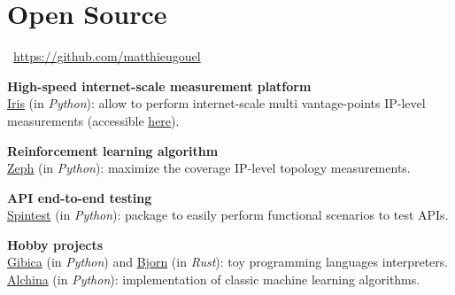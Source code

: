 \documentclass[11pt,a4paper,sans]{moderncv} %
\begin{document}

\section{Open Source}

\faGithub~\href{https://github.com/matthieugouel}{https://github.com/matthieugouel}

\vspace{+0.25cm}
\textbf{High-speed internet-scale measurement platform}\\
\href{https://github.com/dioptra-io/iris}{Iris} (in \emph{Python}): allow to perform internet-scale multi vantage-points IP-level measurements (accessible \href{https://iris.dioptra.io/#/}{here}).

\vspace{+0.25cm}
\textbf{Reinforcement learning algorithm}\\
\href{https://github.com/dioptra-io/zeph}{Zeph} (in \emph{Python}): maximize the coverage IP-level topology measurements.

\vspace{+0.25cm}
\textbf{API end-to-end testing}\\
\href{https://github.com/societe-generale/spintest}{Spintest} (in \emph{Python}): package to easily perform functional scenarios to test APIs.

\vspace{+0.25cm}
\textbf{Hobby projects}\\
\href{https://github.com/matthieugouel/gibica}{Gibica} (in \emph{Python}) and \href{https://github.com/matthieugouel/bjorn}{Bjorn} (in \emph{Rust}): toy programming languages interpreters. \\
\href{https://github.com/matthieugouel/alchina}{Alchina} (in \emph{Python}): implementation of classic machine learning algorithms.



\end{document}
